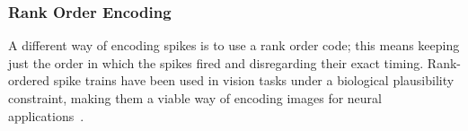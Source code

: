 \subsubsection{Rank Order Encoding}
A different way of encoding spikes is to use a rank order code; this means
keeping just the order in which the spikes fired and disregarding their exact timing.
Rank-ordered spike trains have been used in vision tasks under a biological plausibility constraint, making them a viable way of encoding images for neural applications~\citep{van2001rate,sen2009evaluating,masmoudi2010novel}.
%
%		
%		
%		
